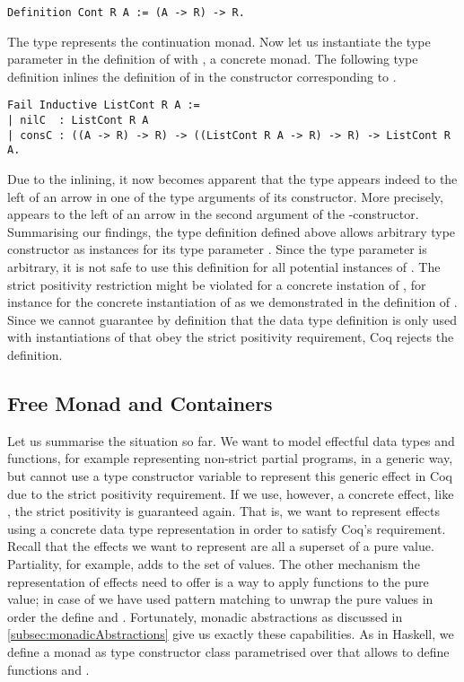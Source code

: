 \begin{verbatim}
Definition Cont R A := (A -> R) -> R.
\end{verbatim}

The type  represents the continuation monad.
Now let us instantiate the type parameter  in the definition of  with , a concrete monad.
The following type definition  inlines the definition of  in the constructor corresponding to .

\begin{verbatim}
Fail Inductive ListCont R A :=
| nilC  : ListCont R A
| consC : ((A -> R) -> R) -> ((ListCont R A -> R) -> R) -> ListCont R A.
\end{verbatim}

Due to the inlining, it now becomes apparent that the type  appears indeed to the left of an arrow in one of the type arguments of its constructor.
More precisely,  appears to the left of an arrow in the second argument of the \--constructor.
Summarising our findings, the type definition  defined above allows arbitrary type constructor as instances for its type parameter .
Since the type parameter is arbitrary, it is not safe to use this definition for all potential instances of .
The strict positivity restriction might be violated for a concrete instation of , for instance for the concrete instantiation of  as we demonstrated in the definition of .
Since we cannot guarantee by definition that the data type definition  is only used with instantiations of  that obey the strict positivity requirement, Coq rejects the definition.

\subsection{Free Monad and Containers}
\label{subsec:freeAndContainers}

Let us summarise the situation so far.
We want to model effectful data types and functions, for example representing non\--strict partial programs, in a generic way, but cannot use a type constructor variable to represent this generic effect in Coq due to the strict positivity requirement.
If we use, however, a concrete effect, like , the strict positivity is guaranteed again.
That is, we want to represent effects using a concrete data type representation in order to satisfy Coq's requirement.
Recall that the effects we want to represent are all a superset of a pure value.
Partiality, for example, adds  to the set of  values.
The other mechanism the representation of effects need to offer is a way to apply functions to the pure value; in case of  we have used pattern matching to unwrap the pure values in order the define  and .
Fortunately, monadic abstractions as discussed in \autoref{subsec:monadicAbstractions} give us exactly these capabilities.
As in Haskell, we define a monad as type constructor class parametrised over  that allows to define functions  and .

